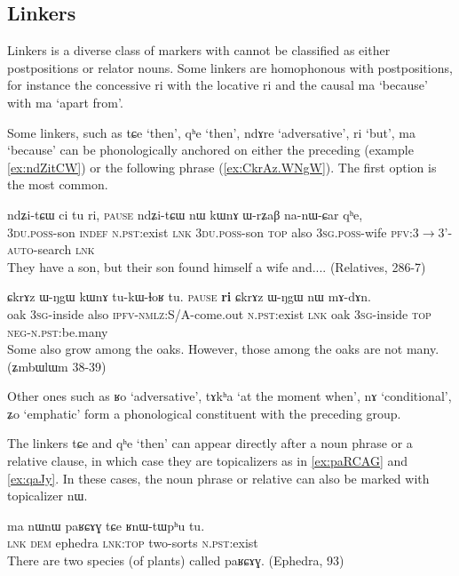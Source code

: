\documentclass[oldfontcommands,oneside,a4paper,11pt]{article}
\newcommand{\ipa}[1]{{\phon \mbox{#1}}} %
\begin{document}
\subsection{Linkers} \label{sec:linkers}
Linkers is a diverse class of markers with cannot be classified as either postpositions or relator nouns.   Some linkers are homophonous with postpositions, for instance the concessive \ipa{ri} with the locative \ipa{ri} and the causal \ipa{ma} `because' with \ipa{ma} `apart from'.

Some linkers, such as    \ipa{tɕe}  `then', \ipa{qʰe} `then', \ipa{ndɤre} `adversative', \ipa{ri} `but', \ipa{ma}  `because' can be phonologically anchored on either the preceding (example \ref{ex:ndZitCW}) or the following phrase (\ref{ex:CkrAz.WNgW}). The first option is the most common.  
 \begin{exe}
\ex \label{ex:ndZitCW} 
\gll
\ipa{ndʑi-tɕɯ}   	\ipa{ci}   	\ipa{tu}   	\ipa{ri,}  \textsc{pause} 	\ipa{ndʑi-tɕɯ}   	\ipa{nɯ}   	\ipa{kɯnɤ}   	\ipa{ɯ-rʑaβ}   	\ipa{na-nɯ-ɕar}   	\ipa{qʰe,}   \\
\textsc{3du.poss}-son \textsc{indef} \textsc{n.pst}:exist \textsc{lnk} {  } \textsc{3du.poss}-son  \textsc{top} also \textsc{3sg.poss}-wife \textsc{pfv}:3$\rightarrow$3'-\textsc{auto}-search \textsc{lnk} \\
\glt They have a son, but their son found himself a wife and.... (Relatives, 286-7)
\end{exe}
 \begin{exe}
\ex \label{ex:CkrAz.WNgW} 
\gll
\ipa{ɕkrɤz}   	\ipa{ɯ-ŋgɯ}   	\ipa{kɯnɤ}   	\ipa{tu-kɯ-ɬoʁ}   	\ipa{tu.}   \textsc{pause}	\ipa{\textbf{ri}}   	\ipa{ɕkrɤz}   	\ipa{ɯ-ŋgɯ}   	\ipa{nɯ}   	\ipa{mɤ-dɤn.}   \\
oak \textsc{3sg}-inside  also \textsc{ipfv-nmlz}:S/A-come.out \textsc{n.pst}:exist {  } \textsc{lnk} oak \textsc{3sg}-inside \textsc{top} \textsc{neg-n.pst}:be.many \\
\glt Some also grow among the oaks. However, those among the oaks are not many. (ʑmbɯlɯm 38-39)
\end{exe}

Other ones such as \ipa{ʁo} `adversative', \ipa{tɤkʰa} `at the moment when', \ipa{nɤ} `conditional', \ipa{ʑo} `emphatic' form a phonological constituent with the preceding group.

The linkers   \ipa{tɕe} and \ipa{qʰe} `then'  can appear directly after a noun phrase or a relative clause, in which case they are topicalizers as in \ref{ex:paRCAG} and \ref{ex:qaJy}. In these cases, the noun phrase or relative can also be marked with topicalizer \ipa{nɯ}.
 \begin{exe}
\ex \label{ex:paRCAG} 
\gll
\ipa{ma}   	\ipa{nɯnɯ}   	\ipa{paʁɕɤɣ}   	\ipa{tɕe}   	\ipa{ʁnɯ-tɯpʰu}   	\ipa{tu.}   \\
\textsc{lnk} \textsc{dem} ephedra \textsc{lnk:top} two-sorts \textsc{n.pst}:exist \\
\glt There are two species (of plants) called \ipa{paʁɕɤɣ}. (Ephedra, 93)
\end{exe}
\end{document}
